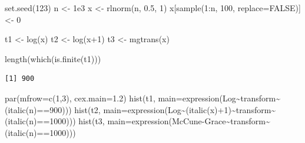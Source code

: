 \documentclass[
  13,
  letterpaper,
]{report}
\newenvironment{Shaded}{\begin{snugshade}}{\end{snugshade}}
\newcommand{\AttributeTok}[1]{\textcolor[rgb]{0.40,0.45,0.13}{#1}}
\newcommand{\ConstantTok}[1]{\textcolor[rgb]{0.56,0.35,0.01}{#1}}
\newcommand{\DecValTok}[1]{\textcolor[rgb]{0.68,0.00,0.00}{#1}}
\newcommand{\FloatTok}[1]{\textcolor[rgb]{0.68,0.00,0.00}{#1}}
\newcommand{\FunctionTok}[1]{\textcolor[rgb]{0.28,0.35,0.67}{#1}}
\newcommand{\NormalTok}[1]{\textcolor[rgb]{0.00,0.23,0.31}{#1}}
\newcommand{\OtherTok}[1]{\textcolor[rgb]{0.00,0.23,0.31}{#1}}
\newcommand{\SpecialCharTok}[1]{\textcolor[rgb]{0.37,0.37,0.37}{#1}}
\begin{document}
\begin{Shaded}
\begin{Highlighting}[]
\FunctionTok{set.seed}\NormalTok{(}\DecValTok{123}\NormalTok{)}
\NormalTok{n }\OtherTok{\textless{}{-}} \FloatTok{1e3}
\NormalTok{x }\OtherTok{\textless{}{-}} \FunctionTok{rlnorm}\NormalTok{(n, }\FloatTok{0.5}\NormalTok{, }\DecValTok{1}\NormalTok{)}
\NormalTok{x[}\FunctionTok{sample}\NormalTok{(}\DecValTok{1}\SpecialCharTok{:}\NormalTok{n, }\DecValTok{100}\NormalTok{, }\AttributeTok{replace=}\ConstantTok{FALSE}\NormalTok{)] }\OtherTok{\textless{}{-}} \DecValTok{0}


\NormalTok{t1 }\OtherTok{\textless{}{-}} \FunctionTok{log}\NormalTok{(x)}
\NormalTok{t2 }\OtherTok{\textless{}{-}} \FunctionTok{log}\NormalTok{(x}\SpecialCharTok{+}\DecValTok{1}\NormalTok{)}
\NormalTok{t3 }\OtherTok{\textless{}{-}} \FunctionTok{mgtrans}\NormalTok{(x)}

\FunctionTok{length}\NormalTok{(}\FunctionTok{which}\NormalTok{(}\FunctionTok{is.finite}\NormalTok{(t1)))}
\end{Highlighting}
\end{Shaded}

\begin{verbatim}
[1] 900
\end{verbatim}

\begin{Shaded}
\begin{Highlighting}[]
\FunctionTok{par}\NormalTok{(}\AttributeTok{mfrow=}\FunctionTok{c}\NormalTok{(}\DecValTok{1}\NormalTok{,}\DecValTok{3}\NormalTok{), }\AttributeTok{cex.main=}\FloatTok{1.2}\NormalTok{)}
\FunctionTok{hist}\NormalTok{(t1, }\AttributeTok{main=}\FunctionTok{expression}\NormalTok{(Log}\SpecialCharTok{\textasciitilde{}}\NormalTok{transform}\SpecialCharTok{\textasciitilde{}}\NormalTok{(}\FunctionTok{italic}\NormalTok{(n)}\SpecialCharTok{==}\DecValTok{900}\NormalTok{)))}
\FunctionTok{hist}\NormalTok{(t2, }\AttributeTok{main=}\FunctionTok{expression}\NormalTok{(Log}\SpecialCharTok{\textasciitilde{}}\NormalTok{(}\FunctionTok{italic}\NormalTok{(x)}\SpecialCharTok{+}\DecValTok{1}\NormalTok{)}\SpecialCharTok{\textasciitilde{}}\NormalTok{transform}\SpecialCharTok{\textasciitilde{}}\NormalTok{(}\FunctionTok{italic}\NormalTok{(n)}\SpecialCharTok{==}\DecValTok{1000}\NormalTok{)))}
\FunctionTok{hist}\NormalTok{(t3, }\AttributeTok{main=}\FunctionTok{expression}\NormalTok{(McCune}\SpecialCharTok{{-}}\NormalTok{Grace}\SpecialCharTok{\textasciitilde{}}\NormalTok{transform}\SpecialCharTok{\textasciitilde{}}\NormalTok{(}\FunctionTok{italic}\NormalTok{(n)}\SpecialCharTok{==}\DecValTok{1000}\NormalTok{)))}
\end{Highlighting}
\end{Shaded}
\end{document}
